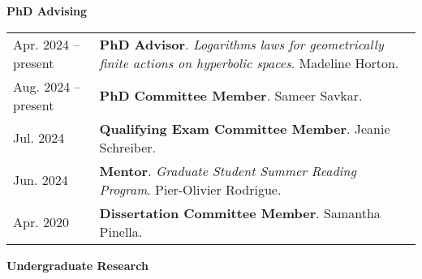 
    \medskip


    \medskip
    \medskip



    \textbf{\large PhD Advising}
    
    \begin{center}
    {
    \renewcommand{\arraystretch}{1.5}
    \begin{longtable}{p{}  p{}}
     Apr.  2024 --    present & \textbf{PhD Advisor}. \textit{Logarithms laws for geometrically finite actions on hyperbolic spaces}.  Madeline Horton.  \\ 
 Aug.  2024 --    present & \textbf{PhD Committee Member}.  Sameer Savkar.  \\ 
 Jul.  2024 & \textbf{Qualifying Exam Committee Member}.  Jeanie Schreiber.  \\ 
 Jun.  2024 & \textbf{Mentor}. \textit{Graduate Student Summer Reading Program}.  Pier-Olivier Rodrigue.  \\ 
 Apr.  2020 & \textbf{Dissertation Committee Member}.  Samantha Pinella.  
    \end{longtable}
    } 
    \end{center}

    \vspace{-1em}
    

    \textbf{\large Undergraduate Research}
    
